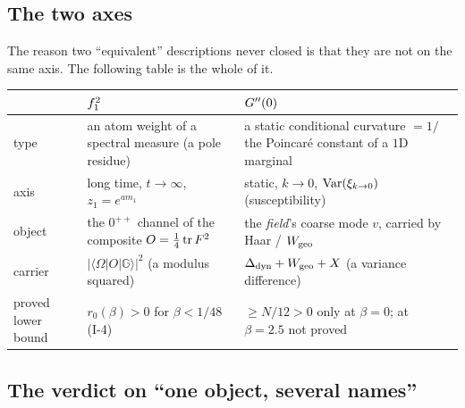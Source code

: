 
\subsection{The two axes}

The reason two ``equivalent'' descriptions never closed is that they are not on the same axis. The
following table is the whole of it.

\begin{center}
\footnotesize
\begin{tabularx}{\textwidth}{@{}p{2.6cm}p{5.4cm}X@{}}
\toprule
 & $f_1^2$ & $G''(0)$ \\
\midrule
type & an atom weight of a spectral measure (a pole residue) & a static conditional curvature
     $=1/$ the Poincar\'e constant of a $1$D marginal \\
axis & long time, $t\to\infty$, $z_1=e^{am_1}$ & static, $k\to0$, $\operatorname{Var}(\xi_{k\to0})$
     (susceptibility) \\
object & the $0^{++}$ channel of the composite $O=\tfrac14\operatorname{tr} F^{2}$ & the \emph{field}'s coarse
     mode $v$, carried by Haar / $W_{\mathrm{geo}}$ \\
carrier & $|\langle\Omega|O|\mathbb{G}\rangle|^{2}$ (a modulus squared)
     & $\Delta_{\mathrm{dyn}}+W_{\mathrm{geo}}+X$ (a variance difference) \\
proved lower bound & $r_0(\beta)>0$ for $\beta<1/48$ (I-4) & $\ge N/12>0$ only at $\beta=0$;
     at $\beta=2.5$ not proved \\
\bottomrule
\end{tabularx}
\end{center}


\subsection{The verdict on ``one object, several names''}


